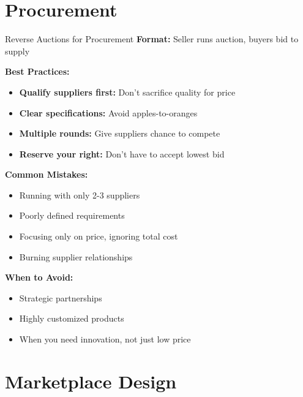 \documentclass[xcolor={x11names}, aspectratio=169 ]{beamer}
\begin{document}
\section{Procurement}

\begin{frame}{Reverse Auctions for Procurement}
\textbf{Format:} Seller runs auction, buyers bid to supply

\textbf{Best Practices:}
\begin{itemize}
  \item \textbf{Qualify suppliers first:} Don't sacrifice quality for price
  \item \textbf{Clear specifications:} Avoid apples-to-oranges
  \item \textbf{Multiple rounds:} Give suppliers chance to compete
  \item \textbf{Reserve your right:} Don't have to accept lowest bid
\end{itemize}

\textbf{Common Mistakes:}
\begin{itemize}
  \item Running with only 2-3 suppliers
  \item Poorly defined requirements
  \item Focusing only on price, ignoring total cost
  \item Burning supplier relationships
\end{itemize}

\textbf{When to Avoid:}
\begin{itemize}
  \item Strategic partnerships
  \item Highly customized products
  \item When you need innovation, not just low price
\end{itemize}
\end{frame}

\section{Marketplace Design}
\end{document}
